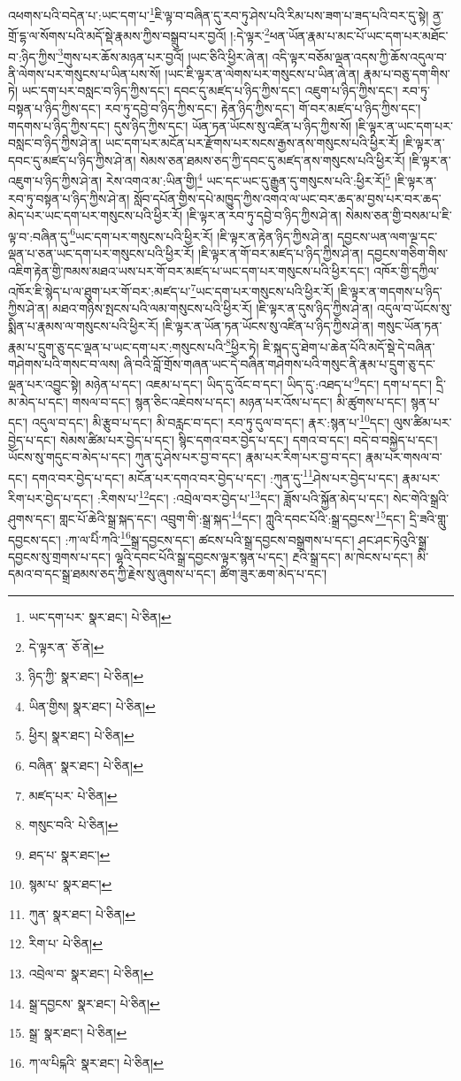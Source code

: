འཕགས་པའི་བདེན་པ་:ཡང་དག་པ་\footnote{ཡང་དག་པར་  སྣར་ཐང་།  པེ་ཅིན། }ཇི་ལྟ་བ་བཞིན་དུ་རབ་ཏུ་ཤེས་པའི་རིམ་པས་ཟག་པ་ཟད་པའི་བར་དུ་སྟེ། ནྱ་གྲོ་དྷ་ལ་སོགས་པའི་མདོ་སྡེ་རྣམས་ཀྱིས་བསྒྲུབ་པར་བྱའོ། །:དེ་ལྟར་\footnote{དེ་ལྟར་ན་  ཅོ་ནེ། }ཕན་ཡོན་རྣམ་པ་མང་པོ་ཡང་དག་པར་མཐོང་བ་:ཉིད་ཀྱིས་\footnote{ཉིད་ཀྱི་  སྣར་ཐང་།  པེ་ཅིན། }གུས་པར་ཆོས་མཉན་པར་བྱའོ། །ཡང་ཅིའི་ཕྱིར་ཞེ་ན། འདི་ལྟར་བཅོམ་ལྡན་འདས་ཀྱི་ཆོས་འདུལ་བ་ནི་ལེགས་པར་གསུངས་པ་ཡིན་པས་སོ། །ཡང་ཇི་ལྟར་ན་ལེགས་པར་གསུངས་པ་ཡིན་ཞེ་ན། རྣམ་པ་བཅུ་དག་གིས་ཏེ། ཡང་དག་པར་བསླང་བ་ཉིད་ཀྱིས་དང་། དབང་དུ་མཛད་པ་ཉིད་ཀྱིས་དང་། འཇུག་པ་ཉིད་ཀྱིས་དང་། རབ་ཏུ་བསྟན་པ་ཉིད་ཀྱིས་དང་། རབ་ཏུ་དབྱེ་བ་ཉིད་ཀྱིས་དང་། རྟེན་ཉིད་ཀྱིས་དང་། གོ་བར་མཛད་པ་ཉིད་ཀྱིས་དང་། གདགས་པ་ཉིད་ཀྱིས་དང་། དུས་ཉིད་ཀྱིས་དང་། ཡོན་ཏན་ཡོངས་སུ་འཛིན་པ་ཉིད་ཀྱིས་སོ། །ཇི་ལྟར་ན་ཡང་དག་པར་བསླང་བ་ཉིད་ཀྱིས་ཤེ་ན། ཡང་དག་པར་མངོན་པར་རྫོགས་པར་སངས་རྒྱས་ནས་གསུངས་པའི་ཕྱིར་རོ། །ཇི་ལྟར་ན་དབང་དུ་མཛད་པ་ཉིད་ཀྱིས་ཤེ་ན། སེམས་ཅན་ཐམས་ཅད་ཀྱི་དབང་དུ་མཛད་ནས་གསུངས་པའི་ཕྱིར་རོ། །ཇི་ལྟར་ན་འཇུག་པ་ཉིད་ཀྱིས་ཤེ་ན། རེས་འགའ་མ་:ཡིན་གྱི།\footnote{ཡིན་གྱིས།  སྣར་ཐང་།  པེ་ཅིན། } ཡང་དང་ཡང་དུ་རྒྱུན་དུ་གསུངས་པའི་:ཕྱིར་རོ།\footnote{ཕྱིར།  སྣར་ཐང་།  པེ་ཅིན། } །ཇི་ལྟར་ན་རབ་ཏུ་བསྟན་པ་ཉིད་ཀྱིས་ཤེ་ན། སློབ་དཔོན་གྱིས་དཔེ་མཁྱུད་ཀྱིས་འགའ་ལ་ཡང་བར་ཆད་མ་བྱས་པར་བར་ཆད་མེད་པར་ཡང་དག་པར་གསུངས་པའི་ཕྱིར་རོ། །ཇི་ལྟར་ན་རབ་ཏུ་དབྱེ་བ་ཉིད་ཀྱིས་ཤེ་ན། སེམས་ཅན་གྱི་བསམ་པ་ཇི་ལྟ་བ་:བཞིན་དུ་\footnote{བཞིན་  སྣར་ཐང་།  པེ་ཅིན། }ཡང་དག་པར་གསུངས་པའི་ཕྱིར་རོ། །ཇི་ལྟར་ན་རྟེན་ཉིད་ཀྱིས་ཤེ་ན། དབྱངས་ཡན་ལག་ལྔ་དང་ལྡན་པ་ཅན་ཡང་དག་པར་གསུངས་པའི་ཕྱིར་རོ། །ཇི་ལྟར་ན་གོ་བར་མཛད་པ་ཉིད་ཀྱིས་ཤེ་ན། དབྱངས་གཅིག་གིས་འཇིག་རྟེན་གྱི་ཁམས་མཐའ་ཡས་པར་གོ་བར་མཛད་པ་ཡང་དག་པར་གསུངས་པའི་ཕྱིར་དང་། འཁོར་གྱི་དཀྱིལ་འཁོར་ཇི་སྙེད་པ་ལ་ཐུག་པར་གོ་བར་:མཛད་པ་\footnote{མཛད་པར་  པེ་ཅིན། }ཡང་དག་པར་གསུངས་པའི་ཕྱིར་རོ། །ཇི་ལྟར་ན་གདགས་པ་ཉིད་ཀྱིས་ཤེ་ན། མཐའ་གཉིས་སྤངས་པའི་ལམ་གསུངས་པའི་ཕྱིར་རོ། །ཇི་ལྟར་ན་དུས་ཉིད་ཀྱིས་ཤེ་ན། འདུལ་བ་ཡོངས་སུ་སྨིན་པ་རྣམས་ལ་གསུངས་པའི་ཕྱིར་རོ། །ཇི་ལྟར་ན་ཡོན་ཏན་ཡོངས་སུ་འཛིན་པ་ཉིད་ཀྱིས་ཤེ་ན། གསུང་ཡོན་ཏན་རྣམ་པ་དྲུག་ཅུ་དང་ལྡན་པ་ཡང་དག་པར་:གསུངས་པའི་\footnote{གསུང་བའི་  པེ་ཅིན། }ཕྱིར་ཏེ། ཇི་སྐད་དུ་ཐེག་པ་ཆེན་པོའི་མདོ་སྡེ་དེ་བཞིན་གཤེགས་པའི་གསང་བ་ལས། ཞི་བའི་བློ་གྲོས་གཞན་ཡང་དེ་བཞིན་གཤེགས་པའི་གསུང་ནི་རྣམ་པ་དྲུག་ཅུ་དང་ལྡན་པར་འབྱུང་སྟེ། མཉེན་པ་དང་། འཇམ་པ་དང་། ཡིད་དུ་འོང་བ་དང་། ཡིད་དུ་:འཐད་པ་\footnote{ཐད་པ་  སྣར་ཐང་། }དང་། དག་པ་དང་། དྲི་མ་མེད་པ་དང་། གསལ་བ་དང་། སྙན་ཅིང་འཇེབས་པ་དང་། མཉན་པར་འོས་པ་དང་། མི་ཚུགས་པ་དང་། སྙན་པ་དང་། འདུལ་བ་དང་། མི་རྩུབ་པ་དང་། མི་བརླང་བ་དང་། རབ་ཏུ་དུལ་བ་དང་། རྣར་:སྙན་པ་\footnote{སྙམ་པ་  སྣར་ཐང་། }དང་། ལུས་ཚིམ་པར་བྱེད་པ་དང་། སེམས་ཚིམ་པར་བྱེད་པ་དང་། སྙིང་དགའ་བར་བྱེད་པ་དང་། དགའ་བ་དང་། བདེ་བ་བསྐྱེད་པ་དང་། ཡོངས་སུ་གདུང་བ་མེད་པ་དང་། ཀུན་དུ་ཤེས་པར་བྱ་བ་དང་། རྣམ་པར་རིག་པར་བྱ་བ་དང་། རྣམ་པར་གསལ་བ་དང་། དགའ་བར་བྱེད་པ་དང་། མངོན་པར་དགའ་བར་བྱེད་པ་དང་། :ཀུན་དུ་\footnote{ཀུན་  སྣར་ཐང་།  པེ་ཅིན། }ཤེས་པར་བྱེད་པ་དང་། རྣམ་པར་རིག་པར་བྱེད་པ་དང་། :རིགས་པ་\footnote{རིག་པ་  པེ་ཅིན། }དང་། :འབྲེལ་བར་བྱེད་པ་\footnote{འབྲེལ་བ་  སྣར་ཐང་།  པེ་ཅིན། }དང་། ཟློས་པའི་སྐྱོན་མེད་པ་དང་། སེང་གེའི་སྒྲའི་ཤུགས་དང་། གླང་པོ་ཆེའི་སྒྲ་སྐད་དང་། འབྲུག་གི་:སྒྲ་སྐད་\footnote{སྒྲ་དབྱངས་  སྣར་ཐང་།  པེ་ཅིན། }དང་། ཀླུའི་དབང་པོའི་:སྒྲ་དབྱངས་\footnote{སྒྲ་  སྣར་ཐང་།  པེ་ཅིན། }དང་། དྲི་ཟའི་གླུ་དབྱངས་དང་། :ཀ་ལ་པིཾ་ཀའི་\footnote{ཀ་ལ་པིངྐའི་  སྣར་ཐང་།  པེ་ཅིན། }སྒྲ་དབྱངས་དང་། ཚངས་པའི་སྒྲ་དབྱངས་བསྒྲགས་པ་དང་། ཤང་ཤང་ཏེའུའི་སྒྲ་དབྱངས་སུ་གྲགས་པ་དང་། ལྷའི་དབང་པོའི་སྒྲ་དབྱངས་ལྟར་སྙན་པ་དང་། རྔའི་སྒྲ་དང་། མ་ཁེངས་པ་དང་། མི་དམའ་བ་དང་སྒྲ་ཐམས་ཅད་ཀྱི་རྗེས་སུ་ཞུགས་པ་དང་། ཚིག་ཟུར་ཆག་མེད་པ་དང་། 